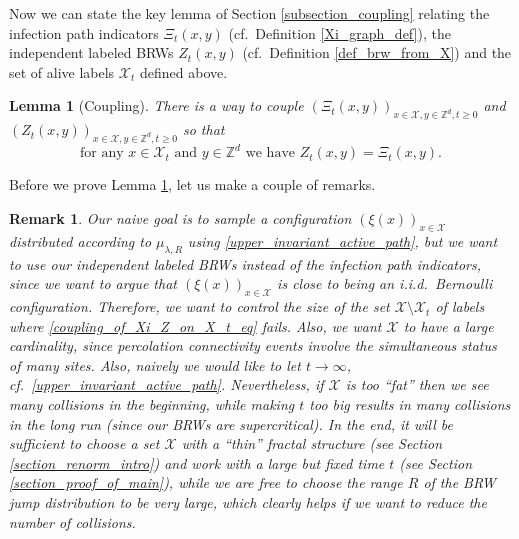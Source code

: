 \documentclass[a4paper,12pt]{article}
\newtheorem  {lemma}         [theorem]{Lemma}
\newtheorem  {remark}        [theorem]{Remark}
\begin{document}
Now we can state the key lemma of Section \ref{subsection_coupling} relating the infection path indicators $\Xi_t(x,y)$ (cf.\ Definition \ref{Xi_graph_def}), the independent labeled BRWs $Z_t(x,y)$ (cf.\ Definition \ref{def_brw_from_X}) and the set of alive labels $\mathcal{X}_t$ defined above.
\begin{lemma}[Coupling]  \label{lemma_coupling}
 There is a way to couple $(\Xi_t(x,y))_{x \in \mathcal{X},y \in \mathbb{Z}^d, t \geq 0}$ and
$(Z_t(x,y))_{x \in \mathcal{X},y \in \mathbb{Z}^d, t \geq 0}$ so that
\begin{equation}\label{coupling_of_Xi_Z_on_X_t_eq}
 \text{for any $x \in \mathcal{X}_{t}$ and $y \in \mathbb{Z}^d$ we have $Z_t(x,y)=\Xi_t(x,y)$.}
\end{equation}
\end{lemma}
Before we prove Lemma \ref{lemma_coupling}, let us make a couple of remarks.
\begin{remark}\label{remark_coupling_pitfalls}
 Our naive goal is to sample a configuration  $(\xi(x))_{x \in \mathcal{X}}$ distributed according to $\mu_{\lambda,R}$ using \eqref{upper_invariant_active_path}, but
 we want to use our independent labeled BRWs instead of the infection path indicators, since we want to argue that $(\xi(x))_{x \in \mathcal{X}}$ is close to being an i.i.d.\ Bernoulli
 configuration.
  Therefore,  we want to control the size of the set $\mathcal{X} \setminus \mathcal{X}_t$ of labels where \eqref{coupling_of_Xi_Z_on_X_t_eq} fails. Also, we want $\mathcal{X}$ to have a large cardinality, since percolation connectivity events involve the simultaneous status of many sites. Also, naively we would like to let $t \to \infty$, cf.\ \eqref{upper_invariant_active_path}.
    Nevertheless, if $\mathcal{X}$ is too ``fat'' then we see many collisions in the beginning, while making $t$ too big results in many collisions in the long run (since
    our BRWs are supercritical). In the end, it will be sufficient to choose a set $\mathcal{X}$ with a ``thin'' fractal structure (see Section \ref{section_renorm_intro}) and work with a large but fixed time $t$ (see Section \ref{section_proof_of_main}), while we are
    free to choose the range $R$ of the BRW jump distribution to be very large, which clearly helps if we want to reduce the number of collisions.
\end{remark}
\end{document}
